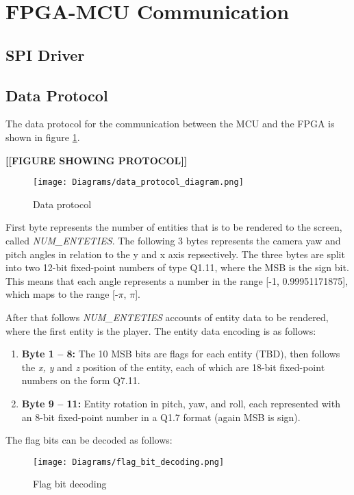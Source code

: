\section{FPGA-MCU Communication}
\subsection{SPI Driver}
\subsection{Data Protocol}
The data protocol for the communication between the MCU and the FPGA is shown in 
figure \ref{fig:spi_data_protocol}.

\textbf{[[FIGURE SHOWING PROTOCOL]]}
\begin{figure}[H]
    \centering
    \texttt{[image: Diagrams/data\_protocol\_diagram.png]}
    \caption{Data protocol}
    \label{fig:spi_data_protocol}
\end{figure}

First byte represents the number of entities that is to be rendered to the screen,
called \textit{NUM\_ENTETIES}. The following 3 bytes represents the camera yaw and pitch angles in 
relation to the y and x axis repsectively. The three bytes are split into two 12-bit 
fixed-point numbers of type Q1.11, where the MSB is the sign bit. This means that 
each angle represents a number in the range [-1, 0.99951171875], which maps to the 
range [-$\pi$, $\pi$].

After that follows \textit{NUM\_ENTETIES} accounts of entity data to be rendered, where 
the first entity is the player. The entity data encoding is as follows:
\begin{enumerate}
    \item \textbf{Byte 1 -- 8:} The 10 MSB bits are flags for each entity (TBD), then follows 
        the \textit{x, y} and \textit{z} position of the entity, each of which are 18-bit fixed-point 
        numbers on the form Q7.11.
    \item \textbf{Byte 9 -- 11:} Entity rotation in pitch, yaw, and roll, each represented with an 
        8-bit fixed-point number in a Q1.7 format (again MSB is sign).
\end{enumerate}

The flag bits can be decoded as follows:
\begin{figure}[H]
    \centering
    \texttt{[image: Diagrams/flag\_bit\_decoding.png]}
    \caption{Flag bit decoding}
    \label{fig:flag_bit_decoding}
\end{figure}
